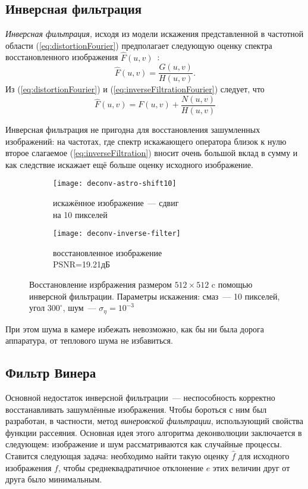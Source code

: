\subsection{Инверсная фильтрация}
\textit{Инверсная фильтрация,} исходя из модели искажения представленной в частотной области (\ref{eq:distortionFourier}) предполагает следующую оценку спектра восстановленного изображения $\hat{F}(u,v)$~\cite[стр.~411]{gonsalesDigital2012}:
\begin{equation}\label{eq:inverseFiltrationFourier}
\hat{F}(u,v) = \frac{G(u,v)}{H(u,v)}.
\end{equation}
Из (\ref{eq:distortionFourier}) и (\ref{eq:inverseFiltrationFourier}) следует, что
\begin{equation}\label{eq:inverseFiltration}
\hat{F}(u,v) = F(u,v) + \frac{N(u,v)}{H(u,v)}
\end{equation}

Инверсная фильтрация не пригодна для восстановления зашумленных изображений: на частотах, где спектр искажающего оператора близок к нулю второе слагаемое (\ref{eq:inverseFiltration}) вносит очень большой вклад в сумму и как следствие искажает ещё больше оценку исходного изображение.
\begin{figure}[h!]
	\begin{subfigure}[b]{0.5\textwidth}
		\texttt{[image: deconv-astro-shift10]}
		\caption{искажённое изображение~--- сдвиг \\на 10 пикселей}
		\label{fig:astroShift10}
	\end{subfigure}%
	\begin{subfigure}[b]{0.5\textwidth}
		\texttt{[image: deconv-inverse-filter]}
		\caption{восстановленное изображение\\ PSNR=19.21дБ}
		\label{fig:astroInverseRestored}
	\end{subfigure}%
	\caption{Восстановление изрбражения размером $512\times 512$ c помощью инверсной фильтрации. Параметры искажения: смаз~--- 10 пикселей, угол $300^\circ$, шум~--- $\sigma_\eta=10^{-3}$}
\end{figure}
При этом шума в камере избежать невозможно, как бы ни была дорога аппаратура, от теплового шума не избавиться.

\subsection{Фильтр Винера}
Основной недостаток инверсной фильтрации~--- неспособность корректно восстанавливать зашумлённые изображения. Чтобы бороться с ним был разработан, в частности, метод \textit{винеровской фильтрации}, использующий свойства функции рассеяния. Основная идея этого алгоритма деконволюции заключается в следующем: изображение и шум рассматриваются как случайные процессы. Ставится следующая задача: необходимо найти такую оценку $\hat{f}$ для исходного изображения $f$, чтобы среднеквадратичное отклонение $e$ этих величин друг от друга было минимальным.

